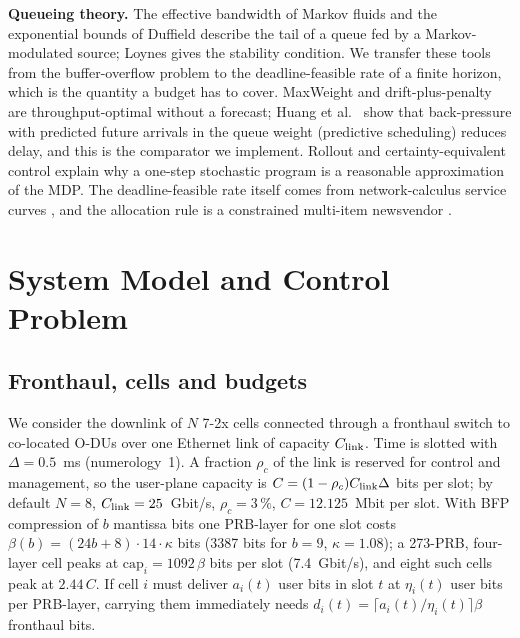 \documentclass[journal]{IEEEtran}
\begin{document}
\textbf{Queueing theory.} The effective bandwidth of Markov fluids \cite{anick1982,kesidis1993,chang1994,kelly1996} and the exponential bounds of Duffield \cite{duffield1994} describe the tail of a queue fed by a Markov-modulated source; Loynes \cite{loynes1962} gives the stability condition. We transfer these tools from the buffer-overflow problem to the deadline-feasible rate of a finite horizon, which is the quantity a budget has to cover. MaxWeight \cite{tassiulas1992} and drift-plus-penalty \cite{neely2010} are throughput-optimal without a forecast; Huang et al.\ \cite{huang2016} show that back-pressure with predicted future arrivals in the queue weight (predictive scheduling) reduces delay, and this is the comparator we implement. Rollout and certainty-equivalent control \cite{bertsekas2020} explain why a one-step stochastic program is a reasonable approximation of the MDP. The deadline-feasible rate itself comes from network-calculus service curves \cite{leboudec2001}, and the allocation rule is a constrained multi-item newsvendor \cite{hadley1963}.

\section{System Model and Control Problem}
\label{sec:model}
\subsection{Fronthaul, cells and budgets}
We consider the downlink of $N$ 7-2x cells connected through a fronthaul switch to co-located O-DUs over one Ethernet link of capacity $C_{\rm link}$. Time is slotted with $\Delta = 0.5$~ms (numerology~1). A fraction $\rho_c$ of the link is reserved for control and management, so the user-plane capacity is $C = (1-\rho_c)C_{\rm link}\Delta$ bits per slot; by default $N = 8$, $C_{\rm link} = 25$~Gbit/s, $\rho_c = 3\,\%$, $C = 12.125$~Mbit per slot. With BFP compression of $b$ mantissa bits one PRB-layer for one slot costs $\beta(b) = (24b + 8)\cdot 14\cdot\kappa$ bits (3387 bits for $b = 9$, $\kappa = 1.08$); a 273-PRB, four-layer cell peaks at $\mathrm{cap}_i = 1092\,\beta$ bits per slot (7.4~Gbit/s), and eight such cells peak at $2.44\,C$. If cell $i$ must deliver $a_i(t)$ user bits in slot $t$ at $\eta_i(t)$ user bits per PRB-layer, carrying them immediately needs $d_i(t) = \lceil a_i(t)/\eta_i(t)\rceil\beta$ fronthaul bits.
\end{document}
